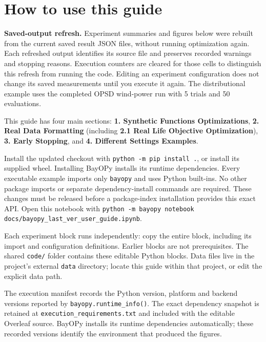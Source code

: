 \documentclass[10pt,a4paper]{article}
\begin{document}
\section*{How to use this guide}

\textbf{Saved-output refresh.} Experiment summaries and figures below were rebuilt from the current saved result JSON files,\allowbreak{} without running optimization again. Each refreshed output identifies its source file and preserves recorded warnings and stopping reasons. Execution counters are cleared for those cells to distinguish this refresh from running the code. Editing an experiment configuration does not change its saved measurements until you execute it again. The distributional example uses the completed OPSD wind-power run with 5 trials and 50 evaluations.


This guide has four main sections: \textbf{1. Synthetic Functions Optimizations},\allowbreak{} \textbf{2. Real Data Formatting} (including \textbf{2.1 Real Life Objective Optimization}),\allowbreak{} \textbf{3. Early Stopping},\allowbreak{} and \textbf{4. Different Settings Examples}.


Install the updated checkout with \texttt{python -m pip install .\allowbreak{}},\allowbreak{} or install its supplied wheel. Installing BayOPy installs its runtime dependencies. Every executable example imports only \texttt{bayopy} and uses Python built-ins. No other package imports or separate dependency-install commands are required. These changes must be released before a package-index installation provides this exact API. Open this notebook with \texttt{python -m bayopy notebook docs/\allowbreak{}bayopy\_\allowbreak{}last\_\allowbreak{}ver\_\allowbreak{}user\_\allowbreak{}guide.\allowbreak{}ipynb}.


Each experiment block runs independently: copy the entire block,\allowbreak{} including its import and configuration definitions. Earlier blocks are not prerequisites. The shared \texttt{code/} folder contains these editable Python blocks. Data files live in the project's external \texttt{data} directory; locate this guide within that project,\allowbreak{} or edit the explicit data path.


The execution manifest records the Python version,\allowbreak{} platform and backend versions reported by \texttt{bayopy.\allowbreak{}runtime\_\allowbreak{}info()}. The exact dependency snapshot is retained at \texttt{execution\_\allowbreak{}requirements.\allowbreak{}txt} and included with the editable Overleaf source. BayOPy installs its runtime dependencies automatically; these recorded versions identify the environment that produced the figures.
\end{document}
